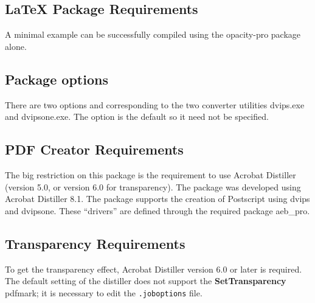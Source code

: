 \documentclass{article}
\let\pkg\textsf
\let\app\textsf
\begin{document}
\subsection{{\LaTeX} Package Requirements}

A minimal example can be successfully compiled using the \pkg{opacity-pro} package alone.


\subsection{Package options}

There are two options  and  corresponding
to the two converter
utilities \app{dvips.exe} and \app{dvipsone.exe}. The  option is the default so
it need not be specified.

\subsection{PDF Creator Requirements}\label{ss:PDFCreator}

The big restriction on this package is the requirement to
use \app{Acrobat Distiller} (version 5.0, or
version 6.0 for transparency). The package was developed using Acrobat
Distiller 8.1. The package supports the creation of Postscript using
\app{dvips} and \app{dvipsone}. These ``drivers'' are defined through the
required package \app{aeb\_pro}.

\subsection{Transparency Requirements}

To get the transparency effect\marginpar{\small\raggedleft\app{Distiller} required}, \app{Acrobat Distiller} version 6.0 or
later is required. The default setting of the distiller does not
support the \textbf{SetTransparency} pdfmark; it is necessary to
edit the \texttt{.joboptions} file.
\end{document}
